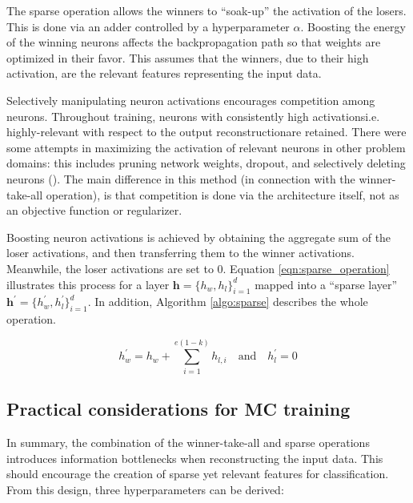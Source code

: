 \par The sparse operation allows the winners to ``soak-up'' the activation of
the losers. This is done via an adder controlled by a hyperparameter
$\alpha$. Boosting the energy of the winning neurons affects the
backpropagation path so that weights are optimized in their favor. This
assumes that the winners, due to their high activation, are the relevant
features representing the input data.

\par Selectively manipulating neuron activations encourages competition among
neurons. Throughout training, neurons with consistently high
activations\textemdash i.e. highly-relevant with respect to the output
reconstruction\textemdash are retained. There were some attempts in
maximizing the activation of relevant neurons in other problem
domains: this includes pruning network weights, dropout, and selectively
deleting neurons (\cite{louizos2017learning, chen2017kate, theis2018faster}).
The main difference in this method (in connection with the winner-take-all
operation), is that competition is done via the architecture itself, not as
an objective function or regularizer.

\par Boosting neuron activations is achieved by obtaining the aggregate sum
of the loser activations, and then transferring them to the winner
activations. Meanwhile, the loser activations are set to $0$. Equation
\ref{eqn:sparse_operation} illustrates this process for a layer $\mathbf{h} =
\{h_{w}, h_{l}\}_{i=1}^{d}$ mapped into a ``sparse layer''
$\mathbf{h}^{\prime} = \{h^{\prime}_w, h^{\prime}_l\}_{i=1}^{d}$. In
addition, Algorithm \ref{algo:sparse} describes the whole operation.

\begin{equation}
  \label{eqn:sparse_operation}
  h^{\prime}_{w} = h_{w} + \sum_{i=1}^{e(1-k)}h_{l,i} \quad \text{and} \quad h^{\prime}_l = 0 
\end{equation}



\subsection{Practical considerations for MC training}

\par In summary, the combination of the winner-take-all and sparse operations
introduces information bottlenecks when reconstructing the input data. This
should encourage the creation of sparse yet relevant features for
classification. From this design, three hyperparameters can be derived:


